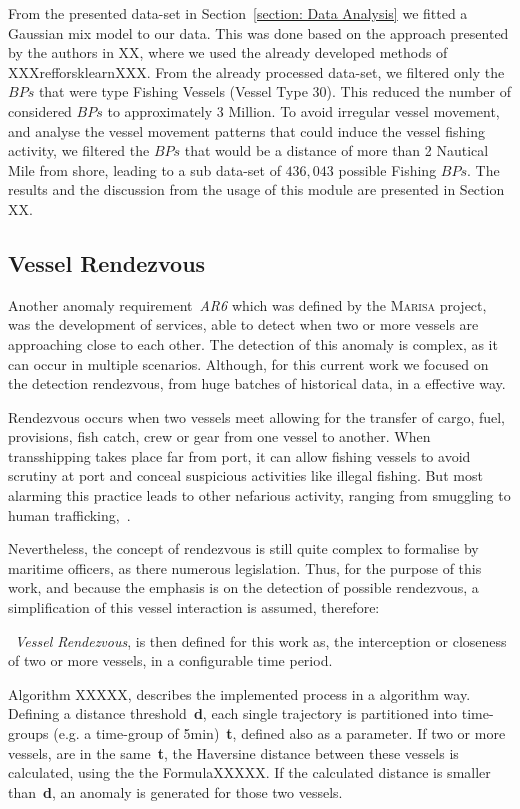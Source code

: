  
From the presented data-set in Section~\ref{section: Data Analysis} we fitted a Gaussian mix model to our data. This was done based on the approach presented by the authors in XX,  where we used the already developed methods of XXXrefforsklearnXXX. From the already  processed data-set, we filtered only the $BPs$ that were type Fishing Vessels (Vessel Type 30). This reduced the number of considered $BPs$ to approximately 3 Million. To avoid irregular vessel movement, and analyse the vessel movement patterns that could induce the vessel fishing activity, we filtered the $BPs$ that would be a distance of more than 2 Nautical Mile from shore, leading to a sub data-set of $436,043$ possible Fishing $BPs$.
The results and the discussion from the usage of this module are presented in Section XX.

\subsection{Vessel Rendezvous}
\label{subsection: 4 Vessel Rendezvous}
Another anomaly requirement~\emph{AR6} which was defined by the \textsc{Marisa} project, was the development of services, able to detect when two or more vessels are approaching close to each other. The detection of this anomaly is complex, as it can occur in multiple scenarios. Although, for this current work we focused on the detection rendezvous, from huge batches of historical data, in a effective way. 

Rendezvous occurs when two vessels meet allowing for the transfer of cargo, fuel, provisions, fish catch, crew or gear from one vessel to another. When transshipping takes place far from port, it can allow fishing vessels to avoid scrutiny at port and conceal suspicious activities like illegal fishing. But most alarming this practice leads to other nefarious activity, ranging from smuggling to human trafficking,~\cite{Miller2018IdentifyingBehavior}.

Nevertheless, the concept of rendezvous is still quite complex to formalise by maritime officers, as there numerous legislation. Thus, for the purpose of this work, and because the emphasis is on the detection of possible rendezvous, a simplification of this vessel interaction is assumed, therefore: 

~\emph{Vessel Rendezvous}, is then defined for this work as, the interception or closeness of two or more vessels, in a configurable time period.


Algorithm XXXXX, describes the implemented process in a algorithm way. Defining a distance threshold~\textbf{d}, each single trajectory is partitioned into time-groups (e.g. a time-group of 5min)~\textbf{t}, defined also as a parameter. If two or more vessels, are in the same~\textbf{t}, the Haversine distance between these vessels is calculated, using the the FormulaXXXXX. If the calculated distance is smaller than~\textbf{d}, an anomaly is generated for those two vessels.

